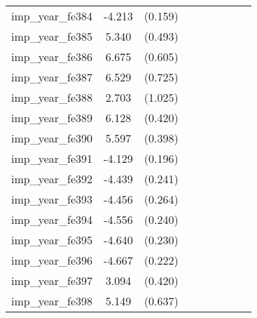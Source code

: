 {\begin{tabular}{l*{4}{cc}}
imp\_year\_fe384&   -4.213\sym{***}&  (0.159)&                  &         &                  &         &                  &         \\
imp\_year\_fe385&    5.340\sym{***}&  (0.493)&                  &         &                  &         &                  &         \\
imp\_year\_fe386&    6.675\sym{***}&  (0.605)&                  &         &                  &         &                  &         \\
imp\_year\_fe387&    6.529\sym{***}&  (0.725)&                  &         &                  &         &                  &         \\
imp\_year\_fe388&    2.703\sym{**} &  (1.025)&                  &         &                  &         &                  &         \\
imp\_year\_fe389&    6.128\sym{***}&  (0.420)&                  &         &                  &         &                  &         \\
imp\_year\_fe390&    5.597\sym{***}&  (0.398)&                  &         &                  &         &                  &         \\
imp\_year\_fe391&   -4.129\sym{***}&  (0.196)&                  &         &                  &         &                  &         \\
imp\_year\_fe392&   -4.439\sym{***}&  (0.241)&                  &         &                  &         &                  &         \\
imp\_year\_fe393&   -4.456\sym{***}&  (0.264)&                  &         &                  &         &                  &         \\
imp\_year\_fe394&   -4.556\sym{***}&  (0.240)&                  &         &                  &         &                  &         \\
imp\_year\_fe395&   -4.640\sym{***}&  (0.230)&                  &         &                  &         &                  &         \\
imp\_year\_fe396&   -4.667\sym{***}&  (0.222)&                  &         &                  &         &                  &         \\
imp\_year\_fe397&    3.094\sym{***}&  (0.420)&                  &         &                  &         &                  &         \\
imp\_year\_fe398&    5.149\sym{***}&  (0.637)&                  &         &                  &         &                  &         \\

\end{tabular}}
